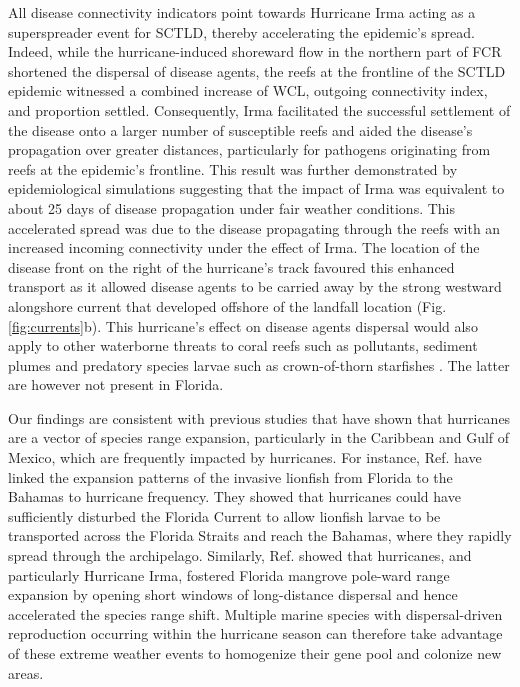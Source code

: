 \documentclass[fleqn,10pt]{wlscirep}
\begin{document}
All disease connectivity indicators point towards Hurricane Irma acting as a superspreader event for SCTLD, thereby accelerating the epidemic's spread. Indeed, while the hurricane-induced shoreward flow in the northern part of FCR shortened the dispersal of disease agents, the reefs at the frontline of the SCTLD epidemic witnessed a combined increase of WCL, outgoing connectivity index, and proportion settled. Consequently, Irma facilitated the successful settlement of the disease onto a larger number of susceptible reefs and aided the disease's propagation over greater distances, particularly for pathogens originating from reefs at the epidemic's frontline. This result was further demonstrated by epidemiological simulations suggesting that the impact of Irma was equivalent to about 25 days of disease propagation under fair weather conditions. This accelerated spread was due to the disease propagating through the reefs with an increased incoming connectivity under the effect of Irma. The location of the disease front on the right of the hurricane's track favoured this enhanced transport as it allowed disease agents to be carried away by the strong westward alongshore current that developed offshore of the landfall location (Fig. \ref{fig:currents}b). This hurricane's effect on disease agents dispersal would also apply to other waterborne threats to coral reefs such as pollutants, sediment plumes and predatory species larvae such as crown-of-thorn starfishes \citep{pratchett2017thirty}. The latter are however not present in Florida.

Our findings are consistent with previous studies that have shown that hurricanes are a vector of species range expansion, particularly in the Caribbean and Gulf of Mexico, which are frequently impacted by hurricanes. For instance, Ref. \cite{Johnston2015hurricanes} have linked the expansion patterns of the invasive lionfish from Florida to the Bahamas to hurricane frequency. They showed that hurricanes could have sufficiently disturbed the Florida Current to allow lionfish larvae to be transported across the Florida Straits and reach the Bahamas, where they rapidly spread through the archipelago. Similarly, Ref. \cite{kennedy2020hurricanes} showed that hurricanes, and particularly Hurricane Irma, fostered Florida mangrove pole-ward range expansion by opening short windows of long-distance dispersal and hence accelerated the species range shift.  Multiple marine species with dispersal-driven reproduction occurring within the hurricane season can therefore take advantage of these extreme weather events to homogenize their gene pool and colonize new areas.
\end{document}
